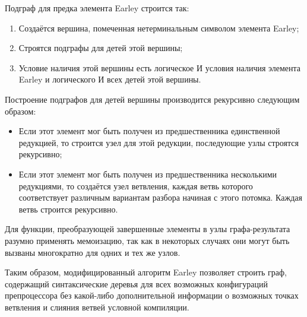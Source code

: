 Подграф для предка элемента Earley строится так:

\begin{enumerate}
\item Создаётся вершина, помеченная нетерминальным символом элемента Earley;
\item Строятся подграфы для детей этой вершины;
\item Условие наличия этой вершины есть логическое И условия наличия элемента Earley и логического И всех детей этой вершины.
\end{enumerate}

Построение подграфов для детей вершины производится рекурсивно следующим образом:

\begin{itemize}
\item Если этот элемент мог быть получен из предшественника единственной редукцией, то строится узел для этой редукции, последующие узлы строятся рекурсивно;
\item Если этот элемент мог быть получен из предшественника несколькими редукциями, то создаётся узел ветвления, каждая ветвь которого соответствует различным вариантам разбора начиная с этого потомка. Каждая ветвь строится рекурсивно.
\end{itemize}

Для функции, преобразующей завершенные элементы в узлы графа-результата разумно применять мемоизацию, так как в некоторых случаях они могут быть вызваны многократно для одних и тех же узлов.

Таким образом, модифицированный алгоритм Earley позволяет строить граф, содержащий синтаксические деревья для всех возможных конфигураций препроцессора без какой-либо дополнительной информации о возможных точках ветвления и слияния ветвей условной компиляции.

